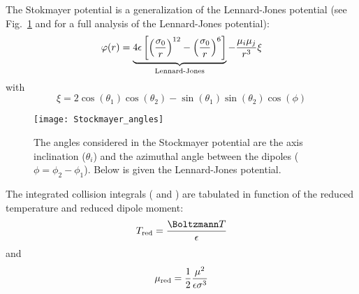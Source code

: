 The Stokmayer potential is a generalization of the Lennard-Jones potential
(see Fig.~\ref{viscosity:Stockmayer_potential} and \citet{Jasper2014} for a
full analysis of the Lennard-Jones potential):
\begin{equation}
\varphi(r) = \underbrace{4 \LJdepth \left[\left(\frac{\LJdia[0]}{r}\right)^{12} - \left(\frac{\LJdia[0]}{r}\right)^{6}\right]}_\text{Lennard-Jones}
             - \frac{\dipole[i]\dipole[j]}{r^3}\xi
\label{Stockmayer:equation}
\end{equation}
with 
\begin{equation}
\xi = 2 \cos(\theta_1)\cos(\theta_2) - \sin(\theta_1)\sin(\theta_2)\cos(\phi)
\end{equation}
\begin{figure}
\centering
\texttt{[image: Stockmayer\_angles]}
\caption[Stockmayer/Lennard-Jones potential]{\label{viscosity:Stockmayer_potential}The angles considered in the
Stockmayer potential are the axis inclination ($\theta_i$) and the azimuthal
angle between the dipoles ($\phi = \phi_2 - \phi_1$). Below is given the
Lennard-Jones potential.}
\end{figure}

The integrated collision integrals ( and ) are tabulated
in function of the reduced temperature and reduced dipole moment:
\begin{equation}
\Temp_\text{red} = \frac{\Boltzmann\Temp}{\LJdepth}
\end{equation}
and
\begin{equation}
\dipole_\text{red} = \frac{1}{2}\frac{\dipole^2}{\LJdepth\LJdia^3}
\end{equation}

